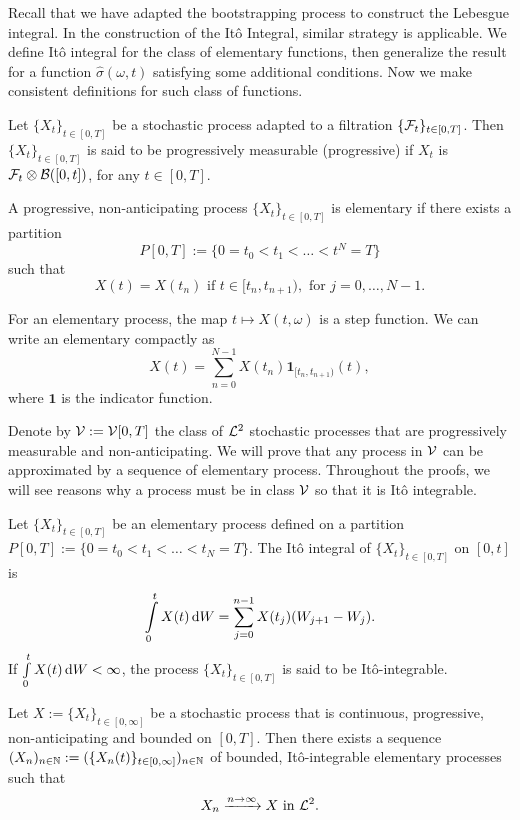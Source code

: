 Recall that we have adapted the bootstrapping process to construct the Lebesgue integral. In the construction of the Itô Integral, similar strategy is applicable. We define Itô integral for the class of elementary functions, then generalize the result for a function $\hat{\sigma}(\omega, t)$ satisfying some additional conditions. Now we make consistent definitions for such class of functions.

\begin{definition}
  Let $\{X_t\}_{t\in[0,T]}$ be a stochastic process adapted to a filtration $\{\mathcal{F}_t\}_{t\in[0,T]}$. Then $\{X_t\}_{t\in[0,T]}$ is said to be progressively measurable (progressive) if $X_t$ is $\mathcal{F}_t\otimes\mathcal{B}([0,t])$, for any $t\in[0,T]$.
\end{definition}

\begin{definition}
  A progressive, non-anticipating process $\{X_t\}_{t\in[0,T]}$ is elementary if there exists a partition
  $$P[0,T]:=\{0=t_0<t_1<\ldots<t^N=T\}$$ such that
  $$X(t) = X(t_n) \text{ if } t \in [t_n, t_{n+1}), \text{ for } j=0,\ldots,N-1.$$
\end{definition}
\begin{remark}
  For an elementary process, the map $t\mapsto X(t,\omega)$ is a step function. We can write an elementary compactly as
  $$X(t) = \sum\limits_{n=0}^{N-1} X(t_n)\mathbf{1}_{[t_n, t_{n+1})}(t),$$
  where $\mathbf{1}$ is the indicator function.
\end{remark}

Denote by $\mathcal{V} := \mathcal{V}[0,T]$ the class of $\mathcal{L}^2$ stochastic processes that are progressively measurable and non-anticipating. We will prove that any process in $\mathcal{V}$ can be approximated by a sequence of elementary process. Throughout the proofs, we will see reasons why a process must be in class $\mathcal{V}$ so that it is Itô integrable.

\begin{definition}
  Let $\{X_t\}_{t\in[0,T]}$ be an elementary process defined on a partition $P[0,T]:=\{0=t_0<t_1<\ldots<t_N=T\}$. The Itô integral of $\{X_t\}_{t\in[0,T]}$ on $[0,t]$ is
  $$\int\limits_0^t X(t)\,\mathrm{d} W = \sum\limits_{j=0}^{n-1} X(t_j)(W_{j+1}-W_{j}).$$
  If $\int\limits_0^t X(t)\,\mathrm{d} W < \infty$, the process $\{X_t\}_{t\in[0,T]}$ is said to be Itô-integrable.
\end{definition}

\begin{lemma}
  \label{lemma:approximation-1}
  Let $X:=\{X_t\}_{t\in[0,\infty]}$ be a stochastic process that is continuous, progressive, non-anticipating and bounded on $[0, T]$. Then there exists a sequence $(X_n)_{n\in\mathbb{N}} := (\{X_n(t)\}_{t\in[0,\infty]})_{n\in\mathbb{N}}$ of bounded, Itô-integrable elementary processes such that
  $$X_n \xrightarrow{n\to\infty} X \text{ in } \mathcal{L}^2.$$
\end{lemma}

